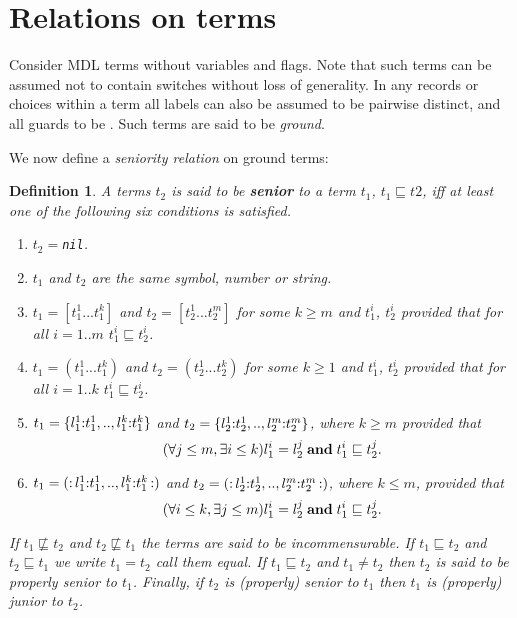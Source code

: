 \documentclass[11pt]{report}
\newtheorem*{mydef}{Definition}
\begin{document}
\section{Relations on terms}

Consider MDL terms without variables and flags. Note that such terms can be assumed not to contain switches without
loss of generality. In any records or choices within a term all labels can also be assumed to be pairwise distinct, and all guards to be \true. Such terms are said to be {\em ground}.

We now define a {\em seniority relation} on ground terms:

\begin{mydef}
A terms $t_2$ is said to be {\em\bf senior} to a term $t_1$, $t_1 \sqsubseteq t2$, iff at least one of the following six conditions is satisfied.
\begin{enumerate}

\item $t_2=$\verb"nil".

\item $t_1$ and $t_2$ are the same symbol, number or string.

\item $t_1=[t^1_1 ... t^k_1]$ and $t_2=[t^1_2 ... t^m_2]$ for some $k\ge m$ and
$t_1^i$, $t_2^i$ provided that for all $i=1..m$ $t^i_1\sqsubseteq t^i_2$.


\item $t_1=(t^1_1 ... t^k_1)$ and $t_2=(t^1_2 ... t^k_2)$ for some $k\ge1$ and
$t_1^i$, $t_2^i$ provided that for all $i=1..k$ $t^i_1\sqsubseteq t^i_2$.

\item $t_1=\{l^1_1\hbox{\rm:}t^1_1,..,l^k_1\hbox{\rm:}t^k_1\}$ and $t_2=\{l^1_2\hbox{\rm:}t^1_2,..,l^m_2\hbox{\rm:}t^m_2\}$, where $k\ge m$ provided that
\[(\forall j\le m, \exists i\le k) l^i_1=l^j_2\; \hbox{\rm\bf and}\; t^i_1\sqsubseteq t^j_2.\]

\item $t_1=\hbox{\rm (:}\,l^1_1\hbox{\rm:}t^1_1,..,l^k_1\hbox{\rm:}t^k_1\,\hbox{\rm :)}$
and $t_2=\hbox{\rm (:}\,l^1_2\hbox{\rm:}t^1_2,..,l^m_2\hbox{\rm:}t^m_2\,\hbox{\rm :)}$,
where $k\le m$, provided that
\[(\forall i\le k, \exists j\le m) l^i_1=l^j_2 \; \hbox{\rm\bf and}\; t^i_1\sqsubseteq t^j_2.\]

\end{enumerate}

If $t_1\not\sqsubseteq t_2$ and $t_2\not\sqsubseteq t_1$ the terms are said to be incommensurable.
If $t_1\sqsubseteq t_2$ and $t_2\sqsubseteq t_1$ we write $t_1=t_2$ call them equal.
If $t_1\sqsubseteq t_2$ and $t_1\ne t_2$ then $t_2$ is said to be {\em properly senior} to $t_1$.
Finally, if $t_2$ is (properly) senior to $t_1$ then $t_1$ is (properly) junior to $t_2$. 
\end{mydef}
\end{document}
